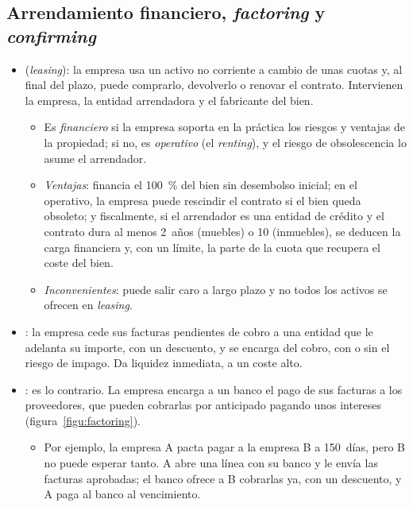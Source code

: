 \documentclass[11pt]{article}
\begin{document}
\subsection{Arrendamiento financiero, \emph{factoring} y \emph{confirming}}\label{anexo:leasing}

\begin{itemize}
\item {} (\emph{leasing}): la empresa usa un activo no corriente a cambio de unas cuotas y, al final del plazo, puede comprarlo, devolverlo o renovar el contrato. Intervienen la empresa, la entidad arrendadora y el fabricante del bien.
  \begin{itemize}
  \item Es \emph{financiero} si la empresa soporta en la práctica los riesgos y ventajas de la propiedad; si no, es \emph{operativo} (el \emph{renting}), y el riesgo de obsolescencia lo asume el arrendador.
  \item \emph{Ventajas}: financia el 100~\% del bien sin desembolso inicial; en el operativo, la empresa puede rescindir el contrato si el bien queda obsoleto; y fiscalmente, si el arrendador es una entidad de crédito y el contrato dura al menos 2~años (muebles) o 10 (inmuebles), se deducen la carga financiera y, con un límite, la parte de la cuota que recupera el coste del bien\nocite{LIS2014}.
  \item \emph{Inconvenientes}: puede salir caro a largo plazo y no todos los activos se ofrecen en \emph{leasing}.
  \end{itemize}
\item {}: la empresa cede sus facturas pendientes de cobro a una entidad que le adelanta su importe, con un descuento, y se encarga del cobro, con o sin el riesgo de impago. Da liquidez inmediata, a un coste alto.
\item {}: es lo contrario. La empresa encarga a un banco el pago de sus facturas a los proveedores, que pueden cobrarlas por anticipado pagando unos intereses (figura~\ref{figu:factoring}).
  \begin{itemize}
  \item Por ejemplo, la empresa A pacta pagar a la empresa B a 150~días, pero B no puede esperar tanto. A abre una línea con su banco y le envía las facturas aprobadas; el banco ofrece a B cobrarlas ya, con un descuento, y A paga al banco al vencimiento.
  \end{itemize}
\end{itemize}
\end{document}
